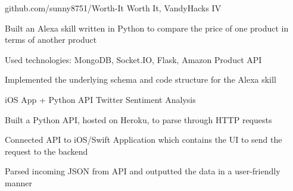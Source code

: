 \documentclass[
    changecolor={0, 38, 58},
]{pranav-resume}
\begin{document}
\cventry
  {github.com/sunny8751/Worth-It}
  {Worth It, VandyHacks IV}
	{}
	{}
  {
    \begin{cvitems}
	\item{Built an Alexa skill written in Python to compare the price of one product in terms of another product}
	\item{Used technologies: MongoDB, Socket.IO, Flask, Amazon Product API}
	\item{Implemented the underlying schema and code structure for the Alexa skill}
    \end{cvitems}
  }
\cventry
  {iOS App + Python API}
  {Twitter Sentiment Analysis}
  {}
  {}
  {
    \begin{cvitems}
	\item{Built a Python API, hosted on Heroku, to parse through HTTP requests}
	\item{Connected API to iOS/Swift Application which contains the UI to send the request to the backend}
	\item{Parsed incoming JSON from API and outputted the data in a user-friendly manner}
    \end{cvitems}
  }

  \begin{cvskills}
  \end{cvskills}
\end{document}
